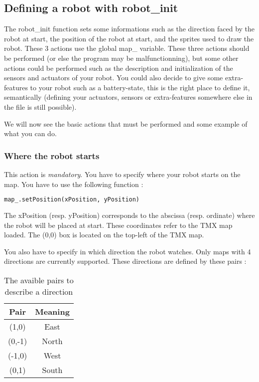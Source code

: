 \documentclass[a4paper,11pt]{article}
\begin{document}
\subsection{Defining a robot with robot\_init}

The robot\_init function sets some informations such as the direction
faced by the robot at start, the position of the robot at start, and
the sprites used to draw the robot. These 3 actions use the global
map\_ variable. These three actions should be performed (or else the
program may be malfunctionning), but some other actions could be
performed such as the description and initialization of the sensors
and actuators of your robot. You could also decide to give some
extra-features to your robot such as a battery-state, this is the
right place to define it, semantically (defining your actuators,
sensors or extra-features somewhere else in the file is still
possible).

We will now see the basic actions that must be performed and some
example of what you can do.

\subsubsection{Where the robot starts}

This action is \emph{mandatory}. You have to specify where your robot
starts on the map. You have to use the following function :

\begin{lstlisting}[language=Python]
map_.setPosition(xPosition, yPosition)
\end{lstlisting}

The xPosition (resp. yPosition) corresponds to the abscissa
(resp. ordinate) where the robot will be placed at start. These
coordinates refer to the TMX map loaded. The (0,0) box is located on
the top-left of the TMX map.

You also have to specify in which direction the robot watches. Only
maps with 4 directions are currently supported. These directions are
defined by these pairs :


\begin{table}[h]
  \begin{center}
    \begin{tabular}{|c|c|}
      \hline
      Pair   & Meaning \\
      \hline
      (1,0)  & East    \\
      (0,-1) & North   \\
      (-1,0) & West    \\
      (0,1)  & South   \\
      \hline
    \end{tabular} 
    \caption{\label{tab:Pypairs} The avaible pairs to describe a
      direction}
  \end{center}
\end{table}
\end{document}
